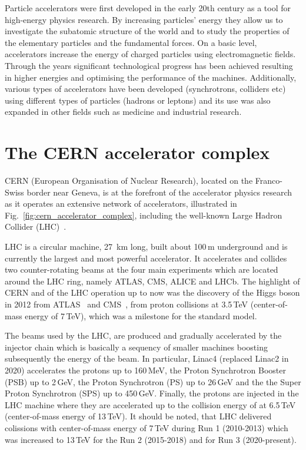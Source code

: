 Particle accelerators were first developed in the early 20th century as a tool for high-energy physics research. By increasing particles' energy they allow us to investigate the subatomic structure of the world and to study the properties of the elementary particles and the fundamental forces. On a basic level, accelerators increase the energy of charged particles using electromagnetic fields. Through the years significant technological progress has been achieved resulting in higher energies and optimising the performance of the machines. Additionally, various types of accelerators have been developed (synchrotrons, colliders etc) using different types of particles (hadrons or leptons) and its use was also expanded in other fields such as medicine and industrial research. 



\section{The CERN accelerator complex}

CERN (European Organisation of Nuclear Research), located on the Franco-Swiss border near Geneva, is at the forefront of the accelerator physics research as it operates an extensive network of accelerators, illustrated in Fig.~\ref{fig:cern_accelerator_complex}, including the well-known Large Hadron Collider (LHC)~\cite{Brüning:782076}.

LHC is a circular machine, 27\, km long, built about 100\,m underground and is currently the largest and most powerful accelerator. It accelerates and collides two counter-rotating beams at the four main experiments which are located around the LHC ring, namely ATLAS, CMS, ALICE and LHCb. The highlight of CERN and of the LHC operation up to now was the discovery of the Higgs boson in 2012 from ATLAS~\cite{ATLAS_Higgs} and CMS~\cite{CMS_Higgs}, from proton collisions at 3.5\,TeV (center-of-mass energy of 7\,TeV), which was a milestone for the standard model. %

The beams used by the LHC, are produced and gradually accelerated by the injector chain which is basically a sequency of smaller machines boosting subsequently the energy of the beam. In particular, Linac4 (replaced Linac2 in 2020) accelerates the protons up to 160\,MeV, the Proton Synchrotron Booster (PSB) up to 2\,GeV, the Proton Synchrotron (PS) up to 26\,GeV and the the Super Proton Synchrotron (SPS) up to 450\,GeV. Finally, the protons are injected in the LHC machine where they are accelerated up to the collision energy of at 6.5\,TeV (center-of-mass energy of 13\,TeV). It should be noted, that LHC delivered colissions with center-of-mass energy of 7\,TeV during Run 1 (2010-2013) which was increased to 13\,TeV for the Run 2 (2015-2018) and for Run 3 (2020-present). 

